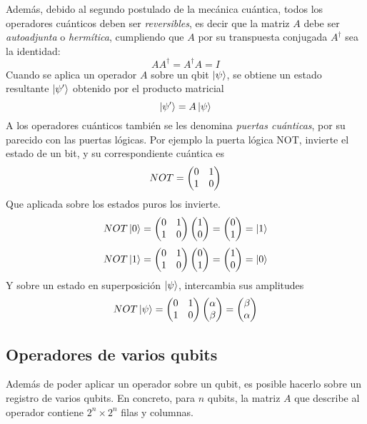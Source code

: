 Además, debido al segundo postulado de la mecánica cuántica, todos los 
operadores cuánticos deben ser \textit{reversibles}, es decir que la matriz $A$ 
debe ser \textit{autoadjunta} o \textit{hermítica}, cumpliendo que $A$ por su 
transpuesta conjugada $A^\dagger$ sea la identidad:
$$ A A^\dagger = A^\dagger A = I$$
%
Cuando se aplica un operador $A$ sobre un qbit $\ket{\psi}$, se obtiene un 
estado resultante $\ket{\psi'}$ obtenido por el producto matricial
$$ \ket{\psi'} = A\ket{\psi} $$
%
A los operadores cuánticos también se les denomina \textit{puertas cuánticas}, 
por su parecido con las puertas lógicas. Por ejemplo la puerta lógica NOT, 
invierte el estado de un bit, y su correspondiente cuántica es
%
$$ NOT = \begin{pmatrix} 0 & 1\\1 & 0 \end{pmatrix} $$
%
Que aplicada sobre los estados puros los invierte.
%
$$ NOT\ket{0} = \begin{pmatrix} 0 & 1\\1 & 0 \end{pmatrix} \begin{pmatrix} 1\\0 \end{pmatrix} = \begin{pmatrix} 0\\1 \end{pmatrix} = \ket{1} $$
$$ NOT\ket{1} = \begin{pmatrix} 0 & 1\\1 & 0 \end{pmatrix} \begin{pmatrix} 0\\1 \end{pmatrix} = \begin{pmatrix} 1\\0 \end{pmatrix} = \ket{0} $$
%
Y sobre un estado en superposición $\ket{\psi}$, intercambia sus amplitudes
%
$$ NOT\ket{\psi} = \begin{pmatrix} 0 & 1\\1 & 0 \end{pmatrix} \begin{pmatrix} \alpha \\ \beta \end{pmatrix} =
\begin{pmatrix} \beta\\\alpha \end{pmatrix} $$
%

\subsection{Operadores de varios qubits}

Además de poder aplicar un operador sobre un qubit, es posible hacerlo sobre un 
registro de varios qubits. En concreto, para $n$ qubits, la matriz $A$ que 
describe al operador contiene $2^n \times 2^n$ filas y columnas.

